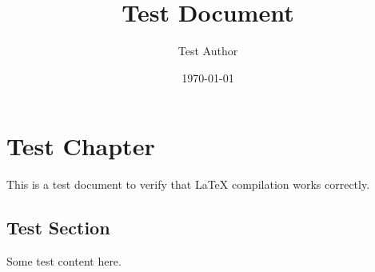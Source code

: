 \documentclass[12pt]{report}
\begin{document}
\title{Test Document}
\author{Test Author}
\date{\today}
\maketitle

\chapter{Test Chapter}

This is a test document to verify that LaTeX compilation works correctly.

\section{Test Section}

Some test content here.
\end{document}
